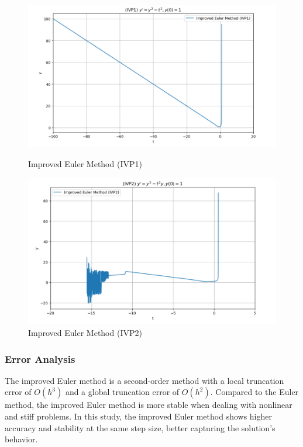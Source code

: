 \documentclass{article}
\begin{document}
\begin{figure}[htbp]
    \centering
    \begin{minipage}[b]{0.45\textwidth}
        \centering
        \includegraphics[width=\textwidth]{pic学长/改进欧拉方法-IVP1.png}
        \caption{Improved Euler Method (IVP1)}
        \label{fig:image1}
    \end{minipage}
    \hspace{0.05\textwidth}
    \begin{minipage}[b]{0.45\textwidth}
        \centering
        \includegraphics[width=\textwidth]{pic学长/改进欧拉方法-IVP2.png}
        \caption{Improved Euler Method (IVP2)}
        \label{fig:image2}
    \end{minipage}
\end{figure}

\subsubsection{Error Analysis}
The improved Euler method is a second-order method with a local truncation error of \( O(h^3) \) and a global truncation error of \( O(h^2) \). Compared to the Euler method, the improved Euler method is more stable when dealing with nonlinear and stiff problems. In this study, the improved Euler method shows higher accuracy and stability at the same step size, better capturing the solution's behavior.
\end{document}
